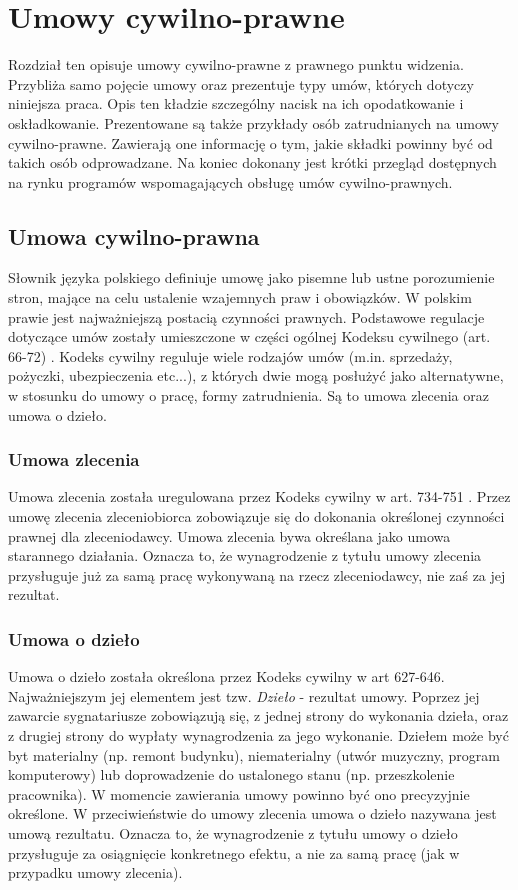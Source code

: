 \chapter{Umowy cywilno-prawne}
\label{chap2}
Rozdział ten opisuje umowy cywilno-prawne z prawnego punktu widzenia. Przybliża samo pojęcie umowy oraz prezentuje typy umów, których dotyczy niniejsza praca. Opis ten kładzie szczególny nacisk na ich opodatkowanie i oskładkowanie. Prezentowane są także przykłady osób zatrudnianych na umowy cywilno-prawne. Zawierają one informację o tym, jakie składki powinny być od takich osób odprowadzane. Na koniec dokonany jest krótki przegląd dostępnych na rynku programów wspomagających obsługę umów cywilno-prawnych.

\section[Umowa cywilno-prawna][Umowa cywilno-prawna]{Umowa cywilno-prawna}
Słownik języka polskiego \cite{slownikJP} definiuje umowę jako pisemne lub ustne porozumienie stron, mające na celu ustalenie wzajemnych praw i obowiązków. W polskim prawie jest najważniejszą postacią czynności prawnych. Podstawowe regulacje dotyczące umów zostały umieszczone w części ogólnej Kodeksu cywilnego (art. 66-72) \cite{kodeksCywilny}. Kodeks cywilny reguluje wiele rodzajów umów (m.in. sprzedaży, pożyczki, ubezpieczenia etc...), z których dwie mogą posłużyć jako alternatywne, w stosunku do umowy o pracę, formy zatrudnienia. Są to umowa zlecenia oraz umowa o dzieło.

\subsection[Umowa zlecenia][Umowa zlecenia]{Umowa zlecenia}
Umowa zlecenia została uregulowana przez Kodeks cywilny w art. 734-751 \cite{kodeksCywilny}. Przez umowę zlecenia zleceniobiorca zobowiązuje się do dokonania określonej czynności prawnej dla zleceniodawcy. Umowa zlecenia bywa określana jako umowa starannego działania. Oznacza to, że wynagrodzenie z tytułu umowy zlecenia przysługuje już za samą pracę wykonywaną na rzecz zleceniodawcy, nie zaś za jej rezultat.

\subsection[Umowa o dzieło][Umowa o dzieło]{Umowa o dzieło}
Umowa o dzieło została określona przez Kodeks cywilny w art 627-646\cite{kodeksCywilny}. Najważniejszym jej elementem jest tzw. \textit{Dzieło} - rezultat umowy. Poprzez jej zawarcie sygnatariusze zobowiązują się, z jednej strony do wykonania dzieła, oraz z drugiej strony do wypłaty wynagrodzenia za jego wykonanie. Dziełem może być byt materialny (np. remont budynku), niematerialny (utwór muzyczny, program komputerowy) lub doprowadzenie do ustalonego stanu (np. przeszkolenie pracownika). W momencie zawierania umowy powinno być ono precyzyjnie określone. W przeciwieństwie do umowy zlecenia umowa o dzieło nazywana jest umową rezultatu. Oznacza to, że wynagrodzenie z tytułu umowy o dzieło przysługuje za osiągnięcie konkretnego efektu, a nie za samą pracę (jak w przypadku umowy zlecenia).

